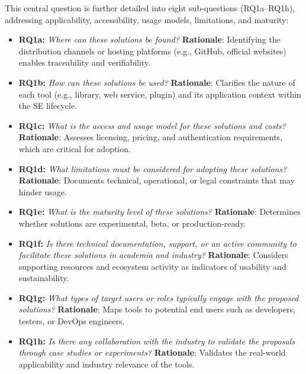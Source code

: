 This central question is further detailed into eight sub-questions (RQ1a–RQ1h), addressing applicability, accessibility, usage models, limitations, and maturity:

\begin{itemize}
    \item \textbf{RQ1a:} \textit{Where can these solutions be found?}  
    \textbf{Rationale}: Identifying the distribution channels or hosting platforms (e.g., GitHub, official websites) enables traceability and verifiability.
    
    \item \textbf{RQ1b:} \textit{How can these solutions be used?}  
    \textbf{Rationale}: Clarifies the nature of each tool (e.g., library, web service, plugin) and its application context within the SE lifecycle.
    
    \item \textbf{RQ1c:} \textit{What is the access and usage model for these solutions and costs?}  
    \textbf{Rationale}: Assesses licensing, pricing, and authentication requirements, which are critical for adoption.
    
    \item \textbf{RQ1d:} \textit{What limitations must be considered for adopting these solutions?}  
    \textbf{Rationale}: Documents technical, operational, or legal constraints that may hinder usage.
    
    \item \textbf{RQ1e:} \textit{What is the maturity level of these solutions?}  
    \textbf{Rationale}: Determines whether solutions are experimental, beta, or production-ready.
    
    \item \textbf{RQ1f:} \textit{Is there technical documentation, support, or an active community to facilitate these solutions in academia and industry?}  
    \textbf{Rationale}: Considers supporting resources and ecosystem activity as indicators of usability and sustainability.
    
    \item \textbf{RQ1g:} \textit{What types of target users or roles typically engage with the proposed solutions?}  
    \textbf{Rationale}: Maps tools to potential end users such as developers, testers, or DevOps engineers.
    
    \item \textbf{RQ1h:} \textit{Is there any collaboration with the industry to validate the proposals through case studies or experiments?}  
    \textbf{Rationale}: Validates the real-world applicability and industry relevance of the tools.
\end{itemize}

